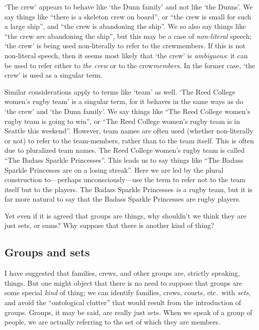 \documentclass[11pt]{article}
\begin{document}
\begin{spacing}{1.5}
`The crew' appears to behave like `the Dunn family' and not like `the
Dunns'.  We say things like ``there is a skeleton crew on board'', or
``the crew is small for such a large ship'', and ``the crew is
abandoning the ship''.  We so also say things like ``the crew {\em
  are} abandoning the ship'', but this may be a case of {\em
  non-literal} speech; `the crew' is being used non-literally to refer
to the crewmembers.  If this is not non-literal speech, then it seems
most likely that `the crew' is {\em ambiguous}: it can be used to
refer either to {\em the crew} or to the crew{\em members}.  In the
former case, `the crew' is used as a singular term.

Similar considerations apply to terms like `team' as well.  `The Reed
College women's rugby team' is a singular term, for it behaves in the
same ways as do `the crew' and `the Dunn family'.  We say things like
``The Reed College women's rugby team is going to win'', or ``The Reed
College women's rugby team is in Seattle this weekend''.  However,
team names are often used (whether non-literally or not) to refer to
the team-members, rather than to the team itself.  This is often due to
pluralized team names.  The Reed College women's rugby team is called
``The Badass Sparkle Princesses''.  This leads us to say things like
``The Badass Sparkle Princesses are on a losing streak''.  Here we are
led by the plural construction to---perhaps unconsciously---use the
term to refer not to the team itself but to the players.  The Badass
Sparkle Princesses {\em is} a rugby team, but it is far more natural
to say that the Badass Sparkle Princesses are rugby players.

Yet even if it is agreed that groups are things, why shouldn't we
think they are just sets, or sums?  Why suppose that there is another
kind of thing?

\subsection{Groups and sets}
\label{group-set}
I have suggested that families, crews, and other groups are, strictly
speaking, things.  But one might object that there is no need to
suppose that groups are some special {\em kind} of thing; we can
identify families, crews, courts, etc.\ with {\em sets}, and avoid the
``ontological clutter'' that would result from the introduction of
groups.  Groups, it may be said, are really just sets.  When we speak
of a group of people, we are actually referring to the set of which
they are members.


\end{spacing}
\end{document}
